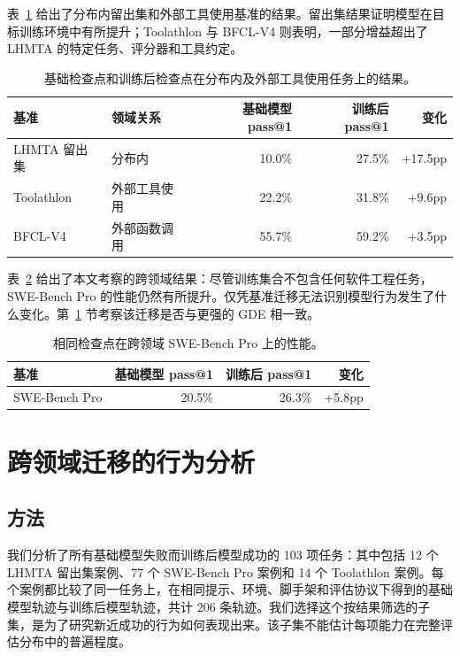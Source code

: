 \documentclass[10pt]{article}
\begin{document}
表~\ref{tab:toolresults} 给出了分布内留出集和外部工具使用基准的结果。留出集结果证明模型在目标训练环境中有所提升；Toolathlon 与 BFCL-V4 则表明，一部分增益超出了 LHMTA 的特定任务、评分器和工具约定。

\begin{table}[H]
\centering
\small
\caption{基础检查点和训练后检查点在分布内及外部工具使用任务上的结果。}
\label{tab:toolresults}
\begin{tabular}{llrrr}
\toprule
基准 & 领域关系 & 基础模型 pass@1 & 训练后 pass@1 & 变化 \\
\midrule
LHMTA 留出集 & 分布内 & 10.0\% & 27.5\% & +17.5pp \\
Toolathlon & 外部工具使用 & 22.2\% & 31.8\% & +9.6pp \\
BFCL-V4 & 外部函数调用 & 55.7\% & 59.2\% & +3.5pp \\
\bottomrule
\end{tabular}
\end{table}

表~\ref{tab:sweresults} 给出了本文考察的跨领域结果：尽管训练集合不包含任何软件工程任务，SWE-Bench Pro 的性能仍然有所提升。仅凭基准迁移无法识别模型行为发生了什么变化。第~\ref{sec:analysis} 节考察该迁移是否与更强的 GDE 相一致。

\begin{table}[H]
\centering
\caption{相同检查点在跨领域 SWE-Bench Pro 上的性能。}
\label{tab:sweresults}
\begin{tabular}{lrrr}
\toprule
基准 & 基础模型 pass@1 & 训练后 pass@1 & 变化 \\
\midrule
SWE-Bench Pro & 20.5\% & 26.3\% & +5.8pp \\
\bottomrule
\end{tabular}
\end{table}

\section{跨领域迁移的行为分析}
\label{sec:analysis}

\subsection{方法}
\label{sec:method}

我们分析了所有基础模型失败而训练后模型成功的 103 项任务：其中包括 12 个 LHMTA 留出集案例、77 个 SWE-Bench Pro 案例和 14 个 Toolathlon 案例。每个案例都比较了同一任务上，在相同提示、环境、脚手架和评估协议下得到的基础模型轨迹与训练后模型轨迹，共计 206 条轨迹。我们选择这个按结果筛选的子集，是为了研究新近成功的行为如何表现出来。该子集不能估计每项能力在完整评估分布中的普遍程度。
\end{document}

